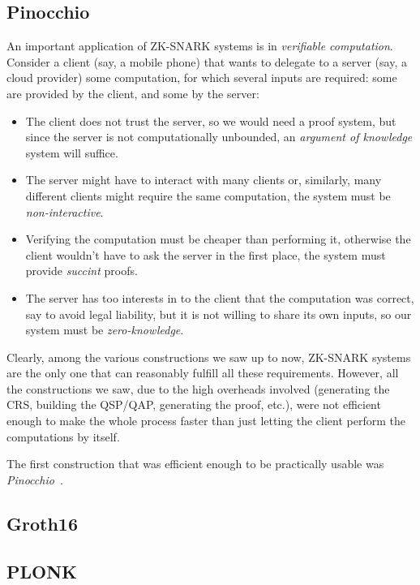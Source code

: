 \subsection{Pinocchio}
An important application of ZK-SNARK systems is in \emph{verifiable computation}.
Consider a client (say, a mobile phone) that wants to delegate to a server (say, a cloud provider) 
some computation, for which several inputs are required: some are provided by the client, 
and some by the server:
\begin{itemize}
  \item The client does not trust the server, so we would need a proof system, but since the server 
        is not computationally unbounded, an \emph{argument of knowledge} system will suffice.
  \item The server might have to interact with many clients or, similarly, many different clients
        might require the same computation, the system must be \emph{non-interactive}.
  \item Verifying the computation must be cheaper than performing it, otherwise the client wouldn't 
        have to ask the server in the first place, the system must provide \emph{succint} proofs.
  \item The server has too interests in to the client that the computation was correct, say to 
        avoid legal liability, but it is not willing to share its own inputs, so our system must
        be \emph{zero-knowledge}.
\end{itemize}
Clearly, among the various constructions we saw up to now, ZK-SNARK systems are the only one that 
can reasonably fulfill all these requirements.
However, all the constructions we saw, due to the high overheads involved 
(generating the CRS, building the QSP/QAP, generating the proof, etc.), were not efficient enough 
to make the whole process faster than just letting the client perform the computations by itself.

The first construction that was efficient enough to be practically usable was 
\emph{Pinocchio}~\cite{ParnoGHR2013}.


\subsection{Groth16}
\subsection{PLONK}
